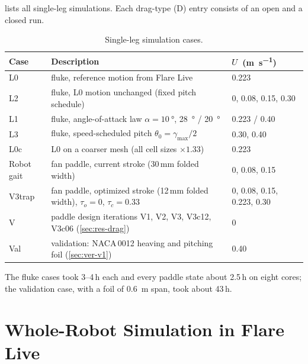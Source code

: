  lists all single-leg simulations. Each drag-type (D) entry consists of an open and a closed run.

\begin{table}[t]
  \centering
  \caption[Single-leg simulation cases]{Single-leg simulation cases.}
  \label{tab:cases}
  \small
  \begin{tabularx}{\textwidth}{@{}l>{\raggedright\arraybackslash}Xl@{}}
    \toprule
    Case & Description & $U$ (\si{\metre\per\second}) \\
    \midrule
    L0 & fluke, reference motion from Flare Live & 0.223 \\
    L2 & fluke, L0 motion unchanged (fixed pitch schedule) & 0, 0.08, 0.15, 0.30 \\
    L1 & fluke, angle-of-attack law $\alpha=\SI{10}{\degree}$, \SI{28}{\degree} / \SI{20}{\degree} & 0.223 / 0.40 \\
    L3 & fluke, speed-scheduled pitch $\theta_0=\gamma_\text{max}/2$ & 0.30, 0.40 \\
    L0c & L0 on a coarser mesh (all cell sizes $\times1.33$) & 0.223 \\
    Robot gait & fan paddle, current stroke (30\,mm folded width) & 0, 0.08, 0.15 \\
    V3trap & fan paddle, optimized stroke (12\,mm folded width), $\tau_o=0$, $\tau_c=0.33$ & 0, 0.08, 0.15, 0.223, 0.30 \\
    V & paddle design iterations V1, V2, V3, V3c12, V3c06 (\cref{sec:res-drag}) & 0 \\
    Val & validation: NACA\,0012 heaving and pitching foil (\cref{sec:ver-v1}) & 0.40 \\
    \bottomrule
  \end{tabularx}
\end{table}

The fluke cases took 3--4\,h each and every paddle state about 2.5\,h on eight cores; the validation case, with a
foil of \SI{0.6}{\metre} span, took about 43\,h.

\section{Whole-Robot Simulation in Flare Live}
\label{sec:cfd-flare}

